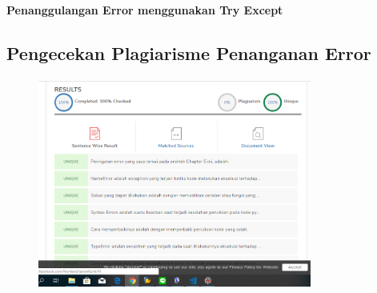 \textbf{Penanggulangan Error menggunakan Try Except}


\subsection{Pengecekan Plagiarisme Penanganan Error}
\begin{figure}[H]
	\includegraphics[width=9cm]{figures/6/Praktek/1174056/Plagiarismeerror.png}
	\centering
\end{figure}
